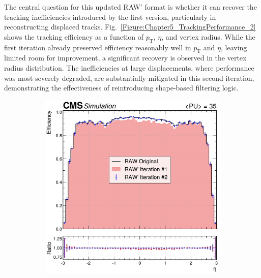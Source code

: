 The central question for this updated RAW' format is whether it can recover the tracking inefficiencies introduced by the first version, particularly in reconstructing displaced tracks. Fig.~\ref{Figure:Chapter5_TrackingPerformance_2} shows the tracking efficiency as a function of $p_\mathrm{T}$, $\eta$, and vertex radius. While the first iteration already preserved efficiency reasonably well in $p_\mathrm{T}$ and $\eta$, leaving limited room for improvement, a significant recovery is observed in the vertex radius distribution. The inefficiencies at large displacements, where performance was most severely degraded, are substantially mitigated in this second iteration, demonstrating the effectiveness of reintroducing shape-based filtering logic.

\begin{figure}[!htbp]
        \centering
        \begin{subfigure}[b]{0.49\textwidth}
            \centering
            \includegraphics[width=\textwidth]{Figures/Chapter5/efficiency_comparison_2_eta.pdf}
            \caption{}
        \end{subfigure}
        \begin{subfigure}[b]{0.49\textwidth}
            \centering

\end{subfigure}
\end{figure}

